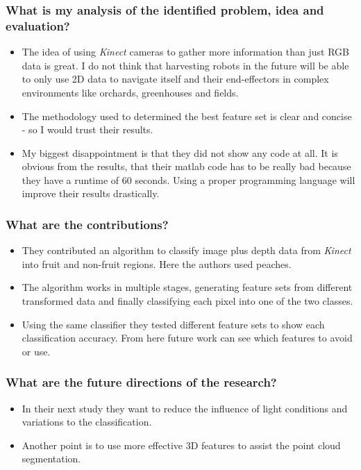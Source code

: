     \subsubsection*{What is my analysis of the identified problem, idea and evaluation?}
    \begin{itemize}
        \item The idea of using \emph{Kinect} cameras to gather more information than just RGB data is great. I do not think that harvesting robots in the future will be able to only use 2D data to navigate itself and their end-effectors in complex environments like orchards, greenhouses and fields.
        \item The methodology used to determined the best feature set is clear and concise - so I would trust their results.
        \item My biggest disappointment is that they did not show any code at all. It is obvious from the results, that their matlab code has to be really bad because they have a runtime of 60 seconds. Using a proper programming language will improve their results drastically.
    \end{itemize}
    \subsubsection*{What are the contributions?}
    \begin{itemize}
        \item They contributed an algorithm to classify image plus depth data from \emph{Kinect} into fruit and non-fruit regions. Here the authors used peaches. 
        \item The algorithm works in multiple stages, generating feature sets from different transformed data and finally classifying each pixel into one of the two classes.
        \item Using the same classifier they tested different feature sets to show each classification accuracy. From here future work can see which features to avoid or use.
    \end{itemize}
    \subsubsection*{What are the future directions of the research?}
    \begin{itemize}
        \item In their next study they want to reduce the influence of light conditions and variations to the classification. 
        \item Another point is to use more effective 3D features to assist the point cloud segmentation.
    \end{itemize}
